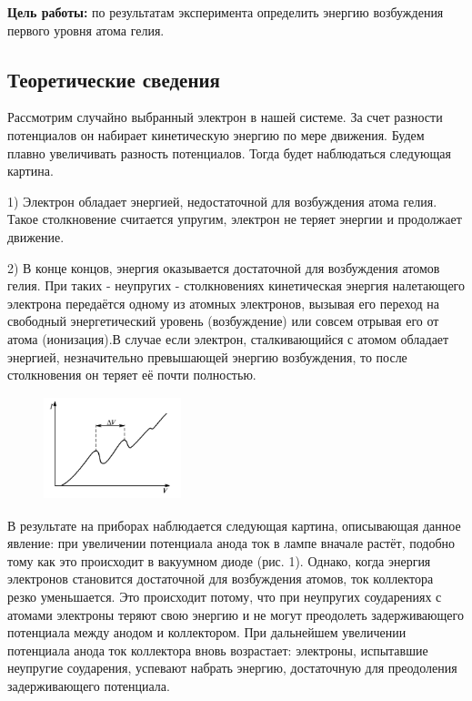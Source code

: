 \documentclass[12pt,a4paper]{article}
\begin{document}
\textbf{Цель работы:} по результатам эксперимента определить энергию возбуждения первого уровня атома гелия.

\subsection{Теоретические сведения}

Рассмотрим случайно выбранный электрон в нашей системе. За счет разности потенциалов он набирает кинетическую энергию по мере движения. Будем плавно увеличивать разность потенциалов. Тогда будет наблюдаться следующая картина. 

1) Электрон обладает энергией, недостаточной для возбуждения атома гелия. Такое столкновение считается упругим, электрон не теряет энергии и продолжает движение.

2) В конце концов, энергия оказывается достаточной для возбуждения атомов гелия. При таких - неупругих - столкновениях кинетическая энергия налетающего электрона передаётся одному из атомных электронов, вызывая его переход на свободный энергетический уровень (возбуждение) или совсем отрывая его от атома (ионизация).В случае если электрон, сталкивающийся с атомом обладает энергией, незначительно превышающей энергию возбуждения, то после столкновения он теряет её почти полностью.

\begin{figure}
	\vspace{-3ex}
	\includegraphics[width=4cm, height=3cm]{5.2.1-1}
\end{figure}		
	

В результате на приборах наблюдается следующая картина, описывающая данное явление: при увеличении потенциала анода ток в лампе вначале растёт, подобно тому как это происходит в вакуумном диоде (рис. 1). Однако, когда энергия электронов становится достаточной для возбуждения атомов, ток коллектора резко уменьшается. Это происходит потому, что при неупругих соударениях с атомами электроны теряют свою энергию и не могут преодолеть задерживающего потенциала между анодом и коллектором. При дальнейшем увеличении потенциала анода ток коллектора вновь возрастает: электроны, испытавшие неупругие соударения, успевают набрать энергию, достаточную для преодоления задерживающего потенциала.
\end{document}
